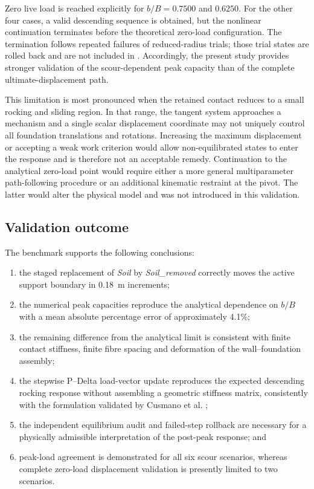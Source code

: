 Zero live load is reached explicitly for $b/B=0.7500$ and $0.6250$. For the
other four cases, a valid descending sequence is obtained, but the nonlinear
continuation terminates before the theoretical zero-load configuration. The
termination follows repeated failures of reduced-radius trials; those trial
states are rolled back and are not included in
. Accordingly, the present study provides
stronger validation of the scour-dependent peak capacity than of the complete
ultimate-displacement path.

This limitation is most pronounced when the retained contact reduces to a
small rocking and sliding region. In that range, the tangent system approaches
a mechanism and a single scalar displacement coordinate may not uniquely
control all foundation translations and rotations. Increasing the maximum
displacement or accepting a weak work criterion would allow non-equilibrated
states to enter the response and is therefore not an acceptable remedy.
Continuation to the analytical zero-load point would require either a more
general multiparameter path-following procedure or an additional kinematic
restraint at the pivot. The latter would alter the physical model and was not
introduced in this validation.

\subsection{Validation outcome}
\label{sec:wall-validation-conclusions}

The benchmark supports the following conclusions:

\begin{enumerate}
    \item the staged replacement of \emph{Soil} by
    \emph{Soil\_removed} correctly moves the active support boundary in
    0.18~m increments;
    \item the numerical peak capacities reproduce the analytical dependence
    on $b/B$ with a mean absolute percentage error of approximately 4.1\%;
    \item the remaining difference from the analytical limit is consistent
    with finite contact stiffness, finite fibre spacing and deformation of
    the wall--foundation assembly;
    \item the stepwise P--Delta load-vector update reproduces the expected
    descending rocking response without assembling a geometric stiffness
    matrix, consistently with the formulation validated by
    Cusmano et al. \cite{Cusmano2023};
    \item the independent equilibrium audit and failed-step rollback are
    necessary for a physically admissible interpretation of the post-peak
    response; and
    \item peak-load agreement is demonstrated for all six scour scenarios,
    whereas complete zero-load displacement validation is presently limited
    to two scenarios.
\end{enumerate}

